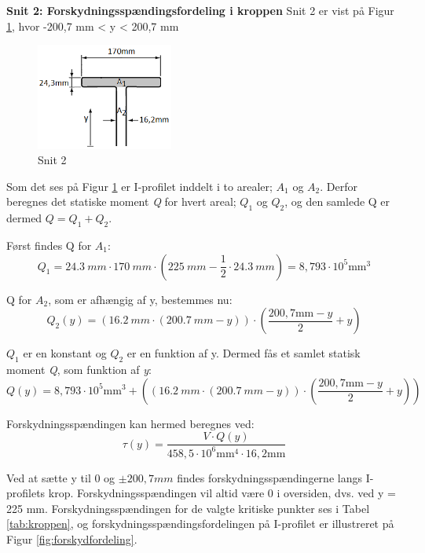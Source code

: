 \textbf{Snit 2: Forskydningsspændingsfordeling i kroppen}
\newline
Snit 2 er vist på Figur \ref{fig:snittoforskyd}, hvor -200,7 mm < y < 200,7 mm

\begin{figure}[H]
	\centering
	\includegraphics[width=0.4\textwidth]{billeder/snittoforskydning.png}
	\caption{Snit 2}
	\label{fig:snittoforskyd}
\end{figure}

Som det ses på Figur \ref{fig:snittoforskyd} er I-profilet inddelt i to arealer; $A_1$ og $A_2$. Derfor beregnes det statiske moment \textit{Q} for hvert areal; $Q_1$ og $Q_2$, og den samlede Q er dermed $Q = Q_1 + Q_2$. 

Først findes Q for $A_1$:
\begin{equation}
	Q_1 = \SI{24,3}{mm} \cdot \SI{170}{mm} \cdot (\SI{225}{mm} - \frac{1}{2} \cdot \SI{24,3}{mm}) = 8,\!793 \cdot 10^5 \text{mm}^3
\end{equation}

Q for $A_2$, som er afhængig af y, bestemmes nu:
\begin{equation}
Q_2(y) = (\SI{16,2}{mm} \cdot (\SI{200,7}{mm} -y)) \cdot (\frac{200\!,7 \text{mm} -y}{2} + y)
\end{equation}

$Q_1$ er en konstant og $Q_2$ er en funktion af y. Dermed fås et samlet statisk moment \textit{Q}, som funktion af \textit{y}:
\begin{equation}
	Q(y) = 8,\!793 \cdot 10^5 \text{mm}^3 + ((\SI{16,2}{mm} \cdot (\SI{200,7}{mm} -y)) \cdot (\frac{200\!,7 \text{mm} -y}{2} + y))
\end{equation}

Forskydningsspændingen kan hermed beregnes ved:
\begin{equation}
	\tau(y) = \frac{V \cdot Q(y)}{458,\!5 \cdot 10^6 \text{mm}^4 \cdot 16,\!2 \text{mm}}
\end{equation}

Ved at sætte y til 0 og $\pm 200,7 mm$ findes forskydningsspændingerne langs I-profilets krop. Forskydningsspændingen vil altid være 0 i oversiden, dvs. ved y = 225 mm. Forskydningsspændingen for de valgte kritiske punkter ses i Tabel \ref{tab:kroppen}, og forskydningsspændingsfordelingen på I-profilet er illustreret på Figur \ref{fig:forskydfordeling}. 

